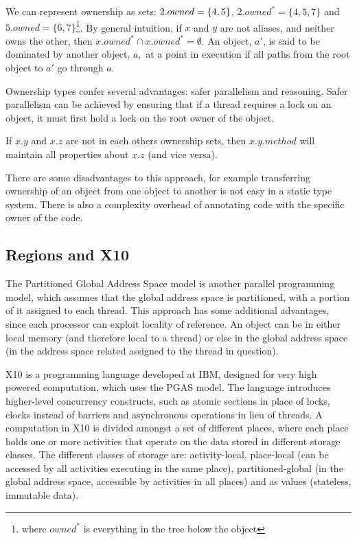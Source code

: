 \documentclass[11pt,a4paper]{report}
\begin{document}
We can represent ownership as sets:
$\/2.owned=\{4,5\}$, $2.owned^{*}=\{4,5,7\}$ and $5.owned=\{6,7\}$\footnote{where $owned^{*}$ is everything in the tree below the object}.
By general intuition, if $x$ and $y$ are not aliases, and neither owns the other, then $x.owned^{*} \cap x.owned^{*} = \emptyset$.
An object, $a'$, is said to be dominated by another object, $a,$ at a point in execution if all paths from the root object to $a'$ go through $a$.

Ownership types confer several advantages: safer parallelism and reasoning.
Safer parallelism\cite{boyapati2002ownership} can be achieved by ensuring that if a thread requires a lock on an object, it must first hold a lock on the root owner of the object.

If $x.y$ and $x.z$ are not in each others ownership sets, then $x.y.method$ will maintain
all properties about $x.z$ (and vice versa).

There are some disadvantages to this approach, for example transferring ownership of an object from one object to another is not easy in a static type system\cite{clarke1998}.
There is also a complexity overhead of annotating code with the specific owner of the code.

\subsection{Regions and X10}
\label{sec:regions}

The Partitioned Global Address Space model\cite{pgas} is another parallel programming model, which assumes that the global address space is partitioned, with a portion of it assigned to each thread.
This approach has some additional advantages, since each processor can exploit locality of reference.
An object can be in either local memory (and therefore local to a thread) or else in the global address space (in the address space related assigned to the thread in question).

X10\cite{x10} is a programming language developed at IBM, designed for very high powered computation, which uses the PGAS model.
The language introduces higher-level concurrency constructs, such as atomic sections in place of locks, clocks instead of barriers and asynchronous operations in lieu of threads.
A computation in X10 is divided amongst a set of different places, where each place holds one or more activities that operate on the data stored in different storage classes.
The different classes of storage are: activity-local, place-local (can be accessed by all activities executing in the same place), partitioned-global (in the global address space, accessible by activities in all places) and as values (stateless, immutable data)\cite{x10-places}.
\end{document}
